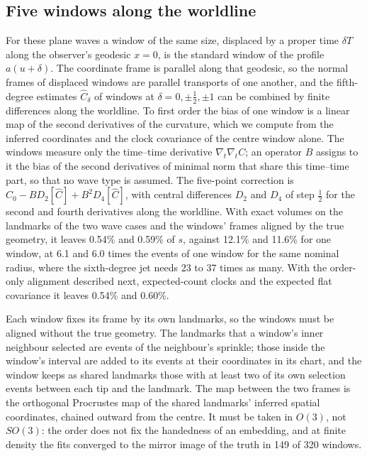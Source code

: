 \documentclass[11pt,a4paper]{article}
\begin{document}
\subsection{Five windows along the worldline}\label{windows}
For these plane waves a window of the same size, displaced by a proper time
$\delta T$ along the observer's geodesic $x=0$, is the standard window of
the profile $a(u+\delta)$. The coordinate frame is parallel along that
geodesic, so the normal frames of displaced windows are parallel transports
of one another, and the fifth-degree estimates $\widehat C_\delta$ of
windows at $\delta=0,\pm\tfrac12,\pm1$ can be combined by finite differences
along the worldline. To first order the bias of one window is a linear map
of the second derivatives of the curvature, which we compute from the
inferred coordinates and the clock covariance of the centre window alone.
The windows measure only the time--time derivative $\nabla_t\nabla_tC$; an
operator $B$ assigns to it the bias of the second derivatives of minimal
norm that share this time--time part, so that no wave type is assumed. The
five-point correction is $\widehat C_0-BD_2[\widehat C]+B^2D_4[\widehat C]$,
with central differences $D_2$ and $D_4$ of step $\tfrac12$ for the second
and fourth derivatives along the worldline. With exact volumes on the
landmarks of the two wave cases and the windows' frames aligned by the true
geometry, it leaves 0.54\% and 0.59\% of $s$, against 12.1\% and 11.6\% for
one window, at 6.1 and 6.0 times the events of one window for the same
nominal radius, where the sixth-degree jet needs 23 to 37 times as many.
With the order-only alignment described next, expected-count clocks and the
expected flat covariance it leaves 0.54\% and 0.60\%.

Each window fixes its frame by its own landmarks, so the windows must be
aligned without the true geometry. The landmarks that a window's inner
neighbour selected are events of the neighbour's sprinkle; those inside the
window's interval are added to its events at their coordinates in its chart,
and the window keeps as shared landmarks those with at least two of its own
selection events between each tip and the landmark. The map between the two
frames is the orthogonal Procrustes map of the shared landmarks' inferred
spatial coordinates, chained outward from the centre.
It must be taken in $O(3)$, not $SO(3)$: the order does not fix the
handedness of an embedding, and at finite density the fits converged to the
mirror image of the truth in 149 of 320 windows.
\end{document}
